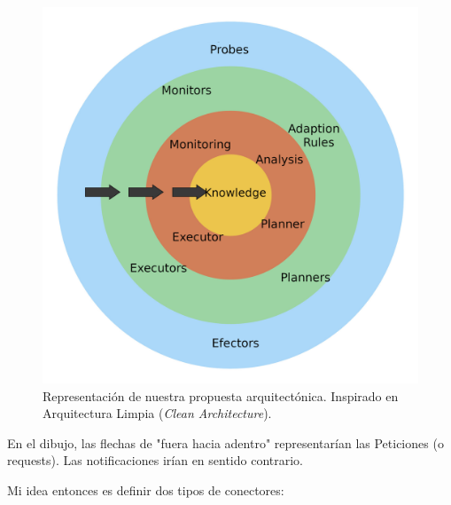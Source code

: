\begin{figure}[htb]
  \centering
  \includegraphics[scale=0.45]{03_arquitectura/images/clean-arch-2-MAPEK-style}
  \caption[Representación de nuestra propuesta arquitectónica. Inspirado en Arquitectura Limpia (\emph{Clean Architecture}).]{Representación de nuestra propuesta arquitectónica. Inspirado en Arquitectura Limpia (\emph{Clean Architecture}). \footnotemark }
  \label{fig:clean-mapek-architecture}
\end{figure}



En el dibujo, las flechas de "fuera hacia adentro" representarían las Peticiones (o requests). Las notificaciones irían en sentido contrario.

Mi idea entonces es definir dos tipos de conectores:

